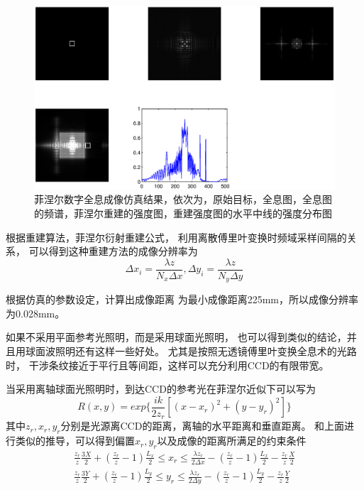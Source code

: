 \documentclass[11pt,a4paper]{article}
\begin{document}
\begin{figure}[htb]
  \centering
  \includegraphics[width=\textwidth]{kuang.eps}
  \caption{菲涅尔数字全息成像仿真结果，依次为，原始目标，全息图，全息图的频谱，菲涅尔重建的强度图，重建强度图的水平中线的强度分布图}
  \label{fig:res_kuang}
\end{figure}

根据重建算法，菲涅尔衍射重建公式，
利用离散傅里叶变换时频域采样间隔的关系，
可以得到这种重建方法的成像分辨率为
\begin{equation}
\Delta x_i = \frac{\lambda z}{N_x \Delta x},
\Delta y_i = \frac{\lambda z}{N_y \Delta y}
\end{equation}

根据仿真的参数设定，计算出成像距离
为最小成像距离225mm，所以成像分辨率为0.028mm。

如果不采用平面参考光照明，而是采用球面光照明，
也可以得到类似的结论，并且用球面波照明还有这样一些好处。
尤其是按照无透镜傅里叶变换全息术的光路时，
干涉条纹接近于平行且等间距，这样可以充分利用CCD的有限带宽。

当采用离轴球面光照明时，到达CCD的参考光在菲涅尔近似下可以写为
\begin{equation}
R(x,y) = exp\{\frac{i k}{2 z_r}[(x-x_r)^2+(y-y_r)^2]\}
\end{equation}
其中$z_r, x_r, y_r$分别是光源离CCD的距离，离轴的水平距离和垂直距离。
和上面进行类似的推导，可以得到偏置$x_r,y_r$以及成像的距离所满足的约束条件
\begin{equation}
\begin{split}
\frac{z_r}{z}\frac{3X}{2} + (\frac{z_r}{z}-1)\frac{L_x}{2} \le x_r \le \frac{\lambda z_r}{2\Delta x} - (\frac{z_r}{z}-1)\frac{L_x}{2}-\frac{z_r}{z}\frac{X}{2} \\
\frac{z_r}{z}\frac{3Y}{2} + (\frac{z_r}{z}-1)\frac{L_y}{2} \le y_r \le \frac{\lambda z_r}{2\Delta y} - (\frac{z_r}{z}-1)\frac{L_y}{2}-\frac{z_r}{z}\frac{Y}{2} 
\end{split}
\end{equation}
\end{document}
